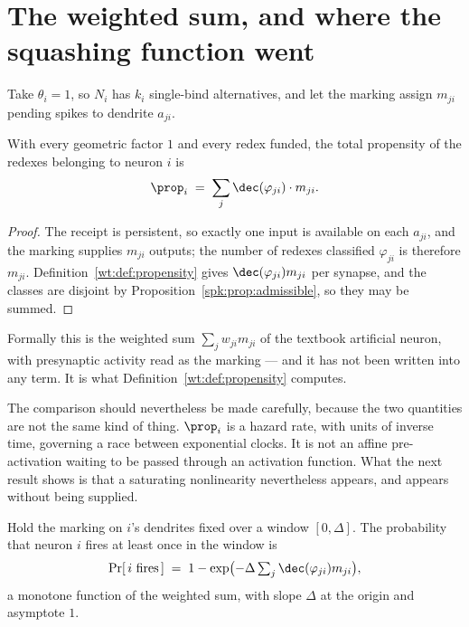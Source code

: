 \section{The weighted sum, and where the squashing function went}
\label{spk:sec:squash}

Take $\theta_i = 1$, so $N_i$ has $k_i$ single-bind alternatives, and let the marking
assign $m_{ji}$ pending spikes to dendrite $a_{ji}$.

\begin{proposition}
\label{spk:prop:sum}
With every geometric factor $1$ and every redex funded, the total propensity of the
redexes belonging to neuron $i$ is
\[
  \prop_i \;=\; \sum_j \dec(\varphi_{ji}) \cdot m_{ji} .
\]
\end{proposition}

\begin{proof}
The receipt is persistent, so exactly one input is available on each $a_{ji}$, and the
marking supplies $m_{ji}$ outputs; the number of redexes classified $\varphi_{ji}$ is
therefore $m_{ji}$. Definition~\ref{wt:def:propensity} gives $\dec(\varphi_{ji})m_{ji}$
per synapse, and the classes are disjoint by Proposition~\ref{spk:prop:admissible}, so
they may be summed.
\end{proof}

Formally this is the weighted sum $\sum_j w_{ji}m_{ji}$ of the textbook artificial
neuron, with presynaptic activity read as the marking --- and it has not been written
into any term. It is what Definition~\ref{wt:def:propensity} computes.

The comparison should nevertheless be made carefully, because the two quantities are not
the same kind of thing. $\prop_i$ is a hazard rate, with units of inverse time, governing
a race between exponential clocks. It is not an affine pre-activation waiting to be
passed through an activation function. What the next result shows is that a saturating
nonlinearity nevertheless appears, and appears without being supplied.

\begin{corollary}
\label{spk:cor:saturate}
Hold the marking on $i$'s dendrites fixed over a window $[0,\Delta]$. The probability
that neuron $i$ fires at least once in the window is
\[
  \Pr[\,i \text{ fires}\,] \;=\; 1 - \exp\bigl(-\Delta \textstyle\sum_j \dec(\varphi_{ji})m_{ji}\bigr),
\]
a monotone function of the weighted sum, with slope $\Delta$ at the origin and asymptote
$1$.
\end{corollary}

